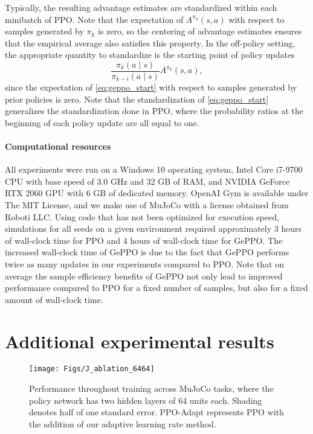 \documentclass{article}
\begin{document}
Typically, the resulting advantage estimates are standardized within each minibatch of PPO. Note that the expectation of $A^{\pi_k}(s,a)$ with respect to samples generated by $\pi_k$ is zero, so the centering of advantage estimates ensures that the empirical average also satisfies this property. In the off-policy setting, the appropriate quantity to standardize is the starting point of policy updates 
\begin{equation}\label{eq:geppo_start}
\frac{\pi_k(a \mid s)}{\pi_{k-i}(a \mid s)} A^{\pi_k}(s,a),
\end{equation}
since the expectation of \eqref{eq:geppo_start} with respect to samples generated by prior policies is zero. Note that the standardization of \eqref{eq:geppo_start} generalizes the standardization done in PPO, where the probability ratios at the beginning of each policy update are all equal to one.

\paragraph{Computational resources}

All experiments were run on a Windows 10 operating system, Intel Core i7-9700 CPU with base speed of $3.0$ GHz and 32 GB of RAM, and NVIDIA GeForce RTX 2060 GPU with 6 GB of dedicated memory. OpenAI Gym \citep{brockman_2016} is available under The MIT License, and we make use of MuJoCo \citep{todorov_2012} with a license obtained from Roboti LLC. Using code that has not been optimized for execution speed, simulations for all seeds on a given environment required approximately 3 hours of wall-clock time for PPO and 4 hours of wall-clock time for GePPO. The increased wall-clock time of GePPO is due to the fact that GePPO performs twice as many updates in our experiments compared to PPO. Note that on average the sample efficiency benefits of GePPO not only lead to improved performance compared to PPO for a fixed number of samples, but also for a fixed amount of wall-clock time. 


\section{Additional experimental results}\label{sec:app_exp}

\begin{figure}[t]
\centering
\texttt{[image: Figs/J\_ablation\_6464]}
\caption{Performance throughout training across MuJoCo tasks, where the policy network has two hidden layers of 64 units each. Shading denotes half of one standard error. PPO-Adapt represents PPO with the addition of our adaptive learning rate method.}\label{fig:J_ablation_6464}
\end{figure}
\end{document}

